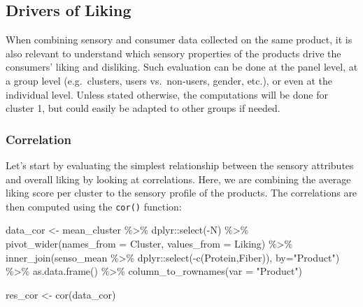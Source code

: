 \documentclass[
]{krantz}
\makeatletter
\newenvironment{Shaded}{\begin{snugshade}}{\end{snugshade}}
\newcommand{\AttributeTok}[1]{\textcolor[rgb]{0.61,0.61,0.61}{#1}}
\newcommand{\FunctionTok}[1]{\textcolor[rgb]{0,0,0}{#1}}
\newcommand{\NormalTok}[1]{#1}
\newcommand{\OtherTok}[1]{\textcolor[rgb]{0.37,0.37,0.37}{#1}}
\newcommand{\SpecialCharTok}[1]{\textcolor[rgb]{0,0,0}{#1}}
\newcommand{\StringTok}[1]{\textcolor[rgb]{0.5,0.5,0.5}{#1}}
\newenvironment{kframe}{%
\medskip{}
\setlength{\fboxsep}{.8em}
 \def\at@end@of@kframe{}%
 \ifinner\ifhmode%
  \def\at@end@of@kframe{\end{minipage}}%
  \begin{minipage}{\columnwidth}%
 \fi\fi%
 \def\FrameCommand##1{\hskip\@totalleftmargin \hskip-\fboxsep
 \colorbox{shadecolor}{##1}\hskip-\fboxsep
     \hskip-\linewidth \hskip-\@totalleftmargin \hskip\columnwidth}%
 \MakeFramed {\advance\hsize-\width
   \@totalleftmargin\z@ \linewidth\hsize
   \@setminipage}}%
 {\par\unskip\endMakeFramed%
 \at@end@of@kframe}
\renewenvironment{Shaded}{\begin{kframe}}{\end{kframe}}
\makeatother
\begin{document}
\hypertarget{drivers-of-liking}{%
\subsection{Drivers of Liking}\label{drivers-of-liking}}

When combining sensory and consumer data collected on the same product, it is also relevant to understand which sensory properties of the products drive the consumers' liking and disliking. Such evaluation can be done at the panel level, at a group level (e.g.~clusters, users vs.~non-users, gender, etc.), or even at the individual level. Unless stated otherwise, the computations will be done for cluster 1, but could easily be adapted to other groups if needed.

\hypertarget{correlation}{%
\subsubsection{Correlation}\label{correlation}}

Let's start by evaluating the simplest relationship between the sensory attributes and overall liking by looking at correlations. Here, we are combining the average liking score per cluster to the sensory profile of the products. The correlations are then computed using the \texttt{cor()} function:

\begin{Shaded}
\begin{Highlighting}[]
\NormalTok{data\_cor }\OtherTok{\textless{}{-}}\NormalTok{ mean\_cluster }\SpecialCharTok{\%\textgreater{}\%}
\NormalTok{  dplyr}\SpecialCharTok{::}\FunctionTok{select}\NormalTok{(}\SpecialCharTok{{-}}\NormalTok{N) }\SpecialCharTok{\%\textgreater{}\%}
  \FunctionTok{pivot\_wider}\NormalTok{(}\AttributeTok{names\_from =}\NormalTok{ Cluster, }\AttributeTok{values\_from =}\NormalTok{ Liking) }\SpecialCharTok{\%\textgreater{}\%}
  \FunctionTok{inner\_join}\NormalTok{(senso\_mean }\SpecialCharTok{\%\textgreater{}\%} 
\NormalTok{               dplyr}\SpecialCharTok{::}\FunctionTok{select}\NormalTok{(}\SpecialCharTok{{-}}\FunctionTok{c}\NormalTok{(Protein,Fiber)), }\AttributeTok{by=}\StringTok{"Product"}\NormalTok{) }\SpecialCharTok{\%\textgreater{}\%}
  \FunctionTok{as.data.frame}\NormalTok{() }\SpecialCharTok{\%\textgreater{}\%}
  \FunctionTok{column\_to\_rownames}\NormalTok{(}\AttributeTok{var =} \StringTok{"Product"}\NormalTok{)}

\NormalTok{res\_cor }\OtherTok{\textless{}{-}} \FunctionTok{cor}\NormalTok{(data\_cor)}
\end{Highlighting}
\end{Shaded}
\end{document}

